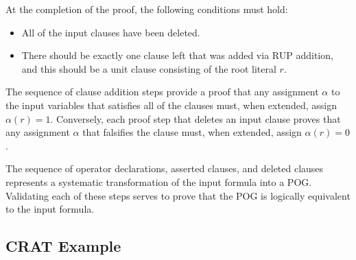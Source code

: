 \documentclass[letterpaper,USenglish,cleveref, autoref, thm-restate]{lipics-v2021}
\newcommand{\assign}{\alpha}
\begin{document}
At the completion of the proof, the following conditions must hold:
\begin{itemize}
\item All of the input clauses have been deleted.
\item There should be exactly one clause left that was added via RUP
  addition, and this should be a unit clause consisting of the root literal $r$.
\end{itemize}
The sequence of clause addition steps provide a proof that any
assignment $\assign$ to the input variables that satisfies all of the
clauses must, when extended, assign $\assign(r) = 1$.  Conversely,
each proof step that deletes an input clause proves that any
assignment $\alpha$ that falsifies the clause must, when extended,
assign $\assign(r) = 0$.

The sequence of operator declarations, asserted clauses, and deleted
clauses represents a systematic transformation of the input formula
into a POG\@.  Validating each of these steps serves to prove that the
POG is logically equivalent to the input formula.

\subsection{CRAT Example}
\end{document}
